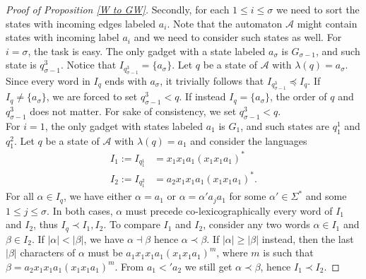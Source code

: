 \documentclass[runningheads]{llncs}
\begin{document}
\begin{proof}[\noindent Proof of Proposition \ref{W to GW}]
Secondly, for each $1 \le i \le \sigma$ we need to sort the states with incoming edges labeled $a_i$. Note that the automaton $\mathcal A$ might contain states with incoming label $a_i$ and we need to consider such states as well. For $i=\sigma$, the task is easy. The only gadget with a state labeled $a_\sigma$ is $G_{\sigma-1}$, and such state is $q_{\sigma-1}^3$. 
Notice that $I_{q_{\sigma-1}^3}=\{a_{\sigma}\}$. %
Let $q$ be a state of $\mathcal A$ with $\lambda(q) = a_\sigma$. Since every word in $I_q$ ends with $a_\sigma$, it trivially follows that $I_{q_{\sigma-1}^3} \preceq I_q$. If $I_q \ne \{a_\sigma\}$, we are forced to set $q_{\sigma-1}^3 < q$. If instead $I_q = \{a_\sigma\}$, the order of $q$ and $q_{\sigma-1}^3$ does not matter. For sake of consistency, we set $q_{\sigma-1}^3 < q$. \\
For $i=1$, the only gadget with states labeled $a_1$ is $G_{1}$, and such states are $q_1^1$ and $q_1^2$. %
Let $q$ be a state of $\mathcal A$ with $\lambda(q) = a_1$ 
and consider the languages
\begin{align*}
    I_1:=I_{q_{1}^1}&=x_1x_1a_1(x_1x_1a_1)^*\\
    I_2:=I_{q_{1}^2}&=a_2x_1x_1a_1(x_1x_1a_1)^*.
\end{align*}
For all $\alpha \in I_q$, we have either $\alpha = a_1$ or $\alpha = \alpha' a_j a_1$ for some $\alpha' \in \Sigma^*$ and some $1 \le j \le \sigma$. 
In both cases, $\alpha$ must precede co-lexicographically every word of $I_1$ and $I_2$, thus $I_q \prec I_1, I_2$. To compare $I_1$ and $I_2$, consider any two words $\alpha \in I_1$ and $\beta \in I_2$. 
If $|\alpha|<|\beta|$, we have $\alpha \dashv \beta$ hence $\alpha \prec \beta$. If $|\alpha|\ge|\beta|$ instead, then the last $|\beta|$ characters of $\alpha$ must be $a_1x_1x_1a_1(x_1x_1a_1)^m$, where $m$ is such that $\beta=a_2x_1x_1a_1(x_1x_1a_1)^m$. 
From $a_1 < ' a_2$ we still get $\alpha \prec \beta$, hence $I_1 \prec I_2$. %

\end{proof}
\end{document}
